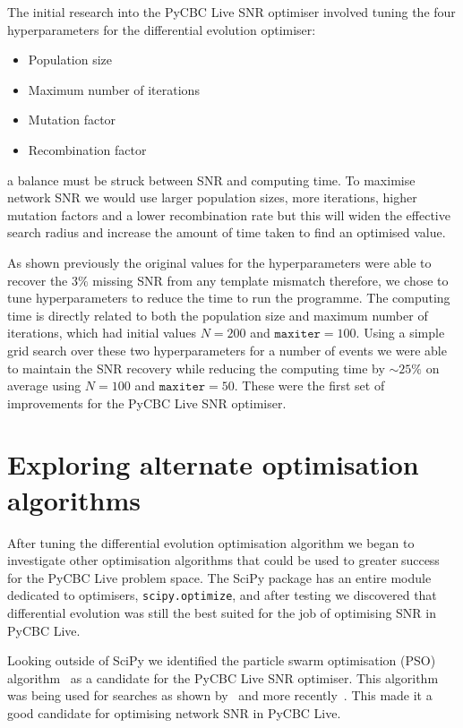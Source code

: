 The initial research into the PyCBC Live SNR optimiser involved tuning the four hyperparameters for the differential evolution optimiser:
%
\begin{itemize}
    \item Population size
    \item Maximum number of iterations
    \item Mutation factor
    \item Recombination factor
\end{itemize}
%
a balance must be struck between SNR and computing time. To maximise network SNR we would use larger population sizes, more iterations, higher mutation factors and a lower recombination rate but this will widen the effective search radius and increase the amount of time taken to find an optimised value.

As shown previously the original values for the hyperparameters were able to recover the $3\%$ missing SNR from any template mismatch therefore, we chose to tune hyperparameters to reduce the time to run the programme. The computing time is directly related to both the population size and maximum number of iterations, which had initial values $N = 200$ and $\texttt{maxiter} = 100$. Using a simple grid search over these two hyperparameters for a number of events we were able to maintain the SNR recovery while reducing the computing time by ${\sim}25\%$ on average using $N = 100$ and $\texttt{maxiter} = 50$. These were the first set of improvements for the PyCBC Live SNR optimiser.




\section{\label{7:sec:exploring_alt_opts}Exploring alternate optimisation algorithms}

After tuning the differential evolution optimisation algorithm we began to investigate other optimisation algorithms that could be used to greater success for the PyCBC Live problem space. The SciPy package has an entire module dedicated to optimisers, \texttt{scipy.optimize}, and after testing we discovered that differential evolution was still the best suited for the job of optimising SNR in PyCBC Live.

Looking outside of SciPy we identified the particle swarm optimisation (PSO) algorithm~\cite{pso:1995} as a candidate for the PyCBC Live SNR optimiser. This algorithm was being used for \gwadj searches as shown by~\cite{pso_search_1:2018} and more recently~\cite{pso_search_2:2023}. This made it a good candidate for optimising network SNR in PyCBC Live.



